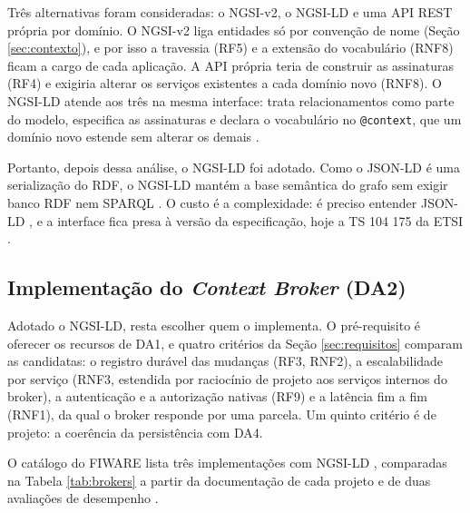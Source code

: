 Três alternativas foram consideradas: o NGSI-v2, o NGSI-LD e uma API REST própria por domínio. O NGSI-v2 liga entidades só por convenção de nome (Seção \ref{sec:contexto}), e por isso a travessia (RF5) e a extensão do vocabulário (RNF8) ficam a cargo de cada aplicação. A API própria teria de construir as assinaturas (RF4) e exigiria alterar os serviços existentes a cada domínio novo (RNF8). O NGSI-LD atende aos três na mesma interface: trata relacionamentos como parte do modelo, especifica as assinaturas e declara o vocabulário no \texttt{@context}, que um domínio novo estende sem alterar os demais \cite{etsi2024ngsild}.

Portanto, depois dessa análise, o NGSI-LD foi adotado. Como o JSON-LD é uma serialização do RDF, o NGSI-LD mantém a base semântica do grafo sem exigir banco RDF nem SPARQL \cite{fiware2026catalogue,abid2022toward}. O custo é a complexidade: é preciso entender JSON-LD \cite{fiware2026tutorials}, e a interface fica presa à versão da especificação, hoje a TS 104 175 da ETSI \cite{etsi2026ts104175}.

\subsection{Implementação do \textit{Context Broker} (DA2)}

Adotado o NGSI-LD, resta escolher quem o implementa. O pré-requisito é oferecer os recursos de DA1, e quatro critérios da Seção \ref{sec:requisitos} comparam as candidatas: o registro durável das mudanças (RF3, RNF2), a escalabilidade por serviço (RNF3, estendida por raciocínio de projeto aos serviços internos do broker), a autenticação e a autorização nativas (RF9) e a latência fim a fim (RNF1), da qual o broker responde por uma parcela. Um quinto critério é de projeto: a coerência da persistência com DA4.

O catálogo do FIWARE lista três implementações com NGSI-LD \cite{fiware2026catalogue}, comparadas na Tabela \ref{tab:brokers} a partir da documentação de cada projeto e de duas avaliações de desempenho \cite{ntallaris2024benchmarking,lazidis2022publish}.

